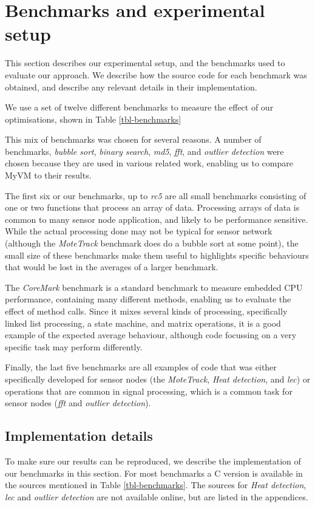 \section{Benchmarks and experimental setup}
\label{sec-evaluation-benchmarks}
This section describes our experimental setup, and the benchmarks used to evaluate our approach. We describe how the source code for each benchmark was obtained, and describe any relevant details in their implementation.

We use a set of twelve different benchmarks to measure the effect of our optimisations, shown in Table \ref{tbl-benchmarks}



This mix of benchmarks was chosen for several reasons. A number of benchmarks, \emph{bubble sort}, \emph{binary search}, \emph{md5}, \emph{fft}, and \emph{outlier detection} were chosen because they are used in various related work, enabling us to compare MyVM to their results.

The first six or our benchmarks, up to \emph{rc5} are all small benchmarks consisting of one or two functions that process an array of data. Processing arrays of data is common to many sensor node application, and likely to be performance sensitive. While the actual processing done may not be typical for sensor network (although the \emph{MoteTrack} benchmark does do a bubble sort at some point), the small size of these benchmarks make them useful to highlights specific behaviours that would be lost in the averages of a larger benchmark.

The \emph{CoreMark} benchmark is a standard benchmark to measure embedded CPU performance, containing many different methods, enabling us to evaluate the effect of method calls. Since it mixes several kinds of processing, specifically linked list processing, a state machine, and matrix operations, it is a good example of the expected average behaviour, although code focussing on a very specific task may perform differently.

Finally, the last five benchmarks are all examples of code that was either specifically developed for sensor nodes (the \emph{MoteTrack}, \emph{Heat detection}, and \emph{lec}) or operations that are common in signal processing, which is a common task for sensor nodes (\emph{fft} and \emph{outlier detection}).


\subsection{Implementation details}
To make sure our results can be reproduced, we describe the implementation of our benchmarks in this section. For most benchmarks a C version is available in the sources mentioned in Table \ref{tbl-benchmarks}. The sources for \emph{Heat detection}, \emph{lec} and \emph{outlier detection} are not available online, but are listed in the appendices.

